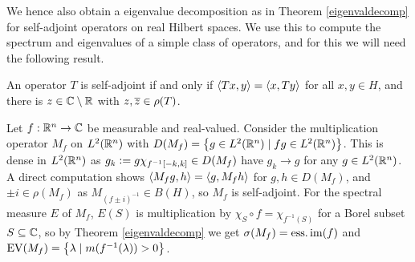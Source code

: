 \documentclass[10pt]{amsart}
\begin{document}
We hence also obtain a eigenvalue decomposition as in Theorem \ref{eigenvaldecomp} for self-adjoint operators on real Hilbert spaces. We use this to compute the spectrum and eigenvalues of a simple class of operators, and for this we will need the following result.
\begin{claim}
    An operator $T$ is self-adjoint if and only if $\left\langle Tx, y \right\rangle = \left\langle x, Ty \right\rangle$ for all $x, y \in H$, and there is $z \in \mathbb{C} \setminus \mathbb{R}$ with $z, \overline{z} \in \rho(T)$.
\end{claim}
\begin{example}
    Let $f : \mathbb{R}^n \to \mathbb{C}$ be measurable and real-valued. Consider the multiplication operator $M_f$ on $L^2(\mathbb{R}^n)$ with $D(M_f) = \left\{  g \in L^2(\mathbb{R}^n) \mid fg \in L^2(\mathbb{R}^n)  \right\}$. This is dense in $L^2(\mathbb{R}^n)$ as $g_k \vcentcolon= g \chi_{f^{-1}[-k, k]} \in D(M_f)$ have $g_k \to g$ for any $g \in L^2(\mathbb{R}^n)$. A direct computation shows $\left\langle M_fg, h \right\rangle = \left\langle g, M_fh \right\rangle$ for $g, h \in D(M_f)$, and $\pm i \in \rho(M_f)$ as $M_{(f \pm i)^{-1}} \in B(H)$, so $M_f$ is self-adjoint. For the spectral measure $E$ of $M_f$, $E(S)$ is multiplication by $\chi_S \circ f = \chi_{f^{-1}(S)}$ for a Borel subset $S \subseteq \mathbb{C}$, so by Theorem \ref{eigenvaldecomp} we get $\sigma(M_f) = \operatorname{ess.im}(f)$ and $\operatorname{EV}(M_f) = \left\{  \lambda \mid m(f^{-1}(\lambda)) > 0  \right\}$.
\end{example}
\end{document}
